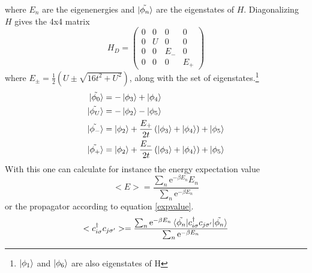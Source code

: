 where $E_n$ are the eigenenergies and $\ket{\tilde{\phi_n}}$ are the eigenstates of $H$. Diagonalizing $H$ gives the 4x4 matrix 
\begin{equation*}
H_D=
\begin{pmatrix}
0 & 0 & 0&0\\
0 & U & 0&0\\
0 & 0 & E_{-}&0\\
0 & 0 & 0&E_{+}
\end{pmatrix}
\end{equation*}
where $E_{\pm}=\frac{1}{2}(U\pm\sqrt{16t^2+U^2})$, along with the set of eigenstates.\footnote{$\ket{\phi_1}$ and $\ket{\phi_6}$ are also eigenstates of H}
\begin{align*}
	\ket{\tilde{\phi_{0}}}&=-\ket{\phi_3}+\ket{\phi_4}\\
	\ket{\tilde{\phi_{U}}}&=-\ket{\phi_2} - \ket{\phi_5}	\\
	\ket{\tilde{\phi_{-}}}&=\ket{\phi_2}+\frac{E_+}{2t}\left( \ket{\phi_3}+\ket{\phi_4}\right) +\ket{\phi_5}	\\
	\ket{\tilde{\phi_{+}}}&=\ket{\phi_2}+\frac{E_-}{2t}\left( \ket{\phi_3}+\ket{\phi_4}\right) +\ket{\phi_5}
\end{align*}
With this one can calculate for instance the energy expectation value 
\begin{equation}
	<E>  = \frac{\sum_{n}^{}\text{e}^{-\beta E_n}E_n}{\sum_{n}^{}\text{e}^{-\beta E_n}}
\end{equation}
or the propagator according to equation \ref{expvalue}.
\begin{equation}
	<c^{\dagger}_{i\sigma}c_{j\sigma^{\prime}}>= \frac{\sum_{n}^{}\text{e}^{-\beta E_n}\braket{\tilde{\phi_n}|c^{\dagger}_{i\sigma}c_{j\sigma^{\prime}}|\tilde{\phi_n}}}{\sum_{n}^{}\text{e}^{-\beta E_n}}
\end{equation}

